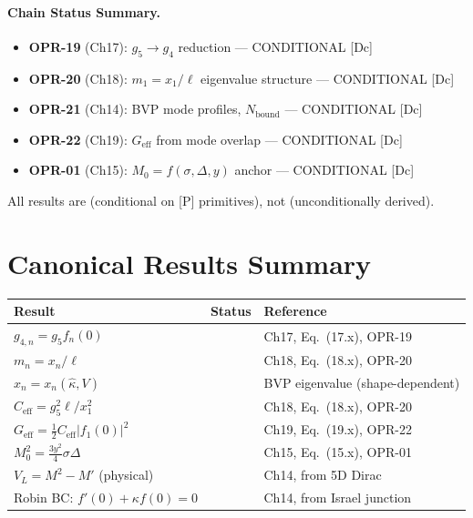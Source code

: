 \paragraph{Chain Status Summary.}
\begin{itemize}[nosep]
    \item \textbf{OPR-19} (Ch17): $g_5 \to g_4$ reduction --- CONDITIONAL [Dc]
    \item \textbf{OPR-20} (Ch18): $m_1 = x_1/\ell$ eigenvalue structure --- CONDITIONAL [Dc]
    \item \textbf{OPR-21} (Ch14): BVP mode profiles, $N_{\text{bound}}$ --- CONDITIONAL [Dc]
    \item \textbf{OPR-22} (Ch19): $G_{\text{eff}}$ from mode overlap --- CONDITIONAL [Dc]
    \item \textbf{OPR-01} (Ch15): $M_0 = f(\sigma, \Delta, y)$ anchor --- CONDITIONAL [Dc]
\end{itemize}

All results are \tagDc{} (conditional on [P] primitives), not \tagDer{} (unconditionally derived).


\section{Canonical Results Summary}
\label{sec:ch20_canonical_results}

\begin{tcolorbox}[colback=green!5!white, colframe=green!50!black,
    title=\textbf{Key Outputs (Derived Conditional on [P] Inputs)}]

\begin{center}
\renewcommand{\arraystretch}{1.4}
\begin{tabular}{p{4cm}lp{5cm}}
\toprule
\textbf{Result} & \textbf{Status} & \textbf{Reference} \\
\midrule
$g_{4,n} = g_5 f_n(0)$ & \tagDc{} & Ch17, Eq.~(17.x), OPR-19 \\
$m_n = x_n / \ell$ & \tagDc{} & Ch18, Eq.~(18.x), OPR-20 \\
$x_n = x_n(\hat\kappa, V)$ & \tagDc{} & BVP eigenvalue (shape-dependent) \\
$C_{\text{eff}} = g_5^2 \ell / x_1^2$ & \tagDc{} & Ch18, Eq.~(18.x), OPR-20 \\
$G_{\text{eff}} = \frac{1}{2} C_{\text{eff}} |f_1(0)|^2$ & \tagDc{} & Ch19, Eq.~(19.x), OPR-22 \\
$M_0^2 = \frac{3y^2}{4} \sigma \Delta$ & \tagDc{} & Ch15, Eq.~(15.x), OPR-01 \\
$V_L = M^2 - M'$ (physical) & \tagDc{} & Ch14, from 5D Dirac \\
Robin BC: $f'(0) + \kappa f(0) = 0$ & \tagDc{} & Ch14, from Israel junction \\
\bottomrule
\end{tabular}
\end{center}

\end{tcolorbox}

